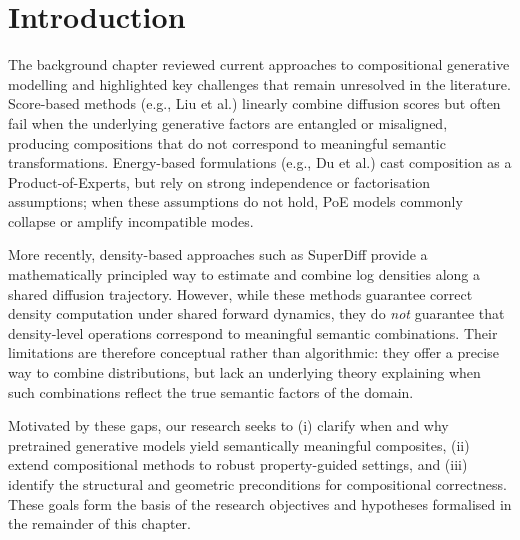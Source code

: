 \section{Introduction}
\label{sec:research_objectives_introduction}

The background chapter reviewed current approaches to compositional generative
modelling and highlighted key challenges that remain unresolved in the
literature. Score-based methods (e.g., Liu et al.) linearly combine diffusion
scores but often fail when the underlying generative factors are entangled or
misaligned, producing compositions that do not correspond to meaningful semantic
transformations. Energy-based formulations (e.g., Du et al.) cast composition as
a Product-of-Experts, but rely on strong independence or factorisation
assumptions; when these assumptions do not hold, PoE models commonly collapse or
amplify incompatible modes.

More recently, density-based approaches such as SuperDiff provide a
mathematically principled way to estimate and combine log densities along a
shared diffusion trajectory. However, while these methods guarantee correct
density computation under shared forward dynamics, they do \emph{not} guarantee
that density-level operations correspond to meaningful semantic combinations.
Their limitations are therefore conceptual rather than algorithmic: they offer a
precise way to combine distributions, but lack an underlying theory explaining
when such combinations reflect the true semantic factors of the domain.

Motivated by these gaps, our research seeks to (i) clarify when and why
pretrained generative models yield semantically meaningful composites,
(ii) extend compositional methods to robust property-guided settings, and
(iii) identify the structural and geometric preconditions for compositional
correctness. These goals form the basis of the research objectives and
hypotheses formalised in the remainder of this chapter.
